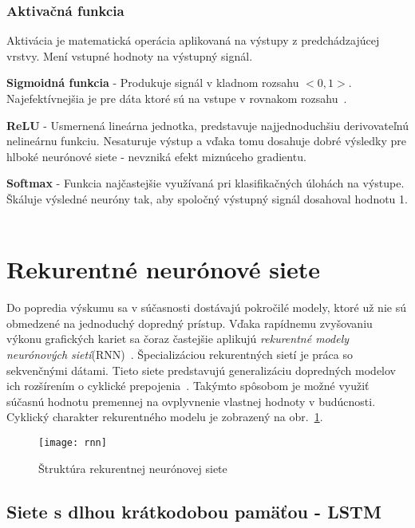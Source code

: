 \subsubsection*{Aktivačná funkcia}
\label{activation_function}

Aktivácia je matematická operácia aplikovaná na výstupy z predchádzajúcej vrstvy. Mení vstupné hodnoty na výstupný signál. 

\textbf{Sigmoidná funkcia} - Produkuje signál v kladnom rozsahu $<0,1>$. Najefektívnejšia je pre dáta ktoré sú na vstupe v rovnakom rozsahu~\cite{sibi2013analysis}.

\textbf{ReLU} - Usmernená lineárna jednotka, predstavuje najjednoduchšiu derivovateľnú nelineárnu funkciu. Nesaturuje výstup a vďaka tomu dosahuje dobré výsledky pre hlboké neurónové siete - nevzniká efekt miznúceho gradientu.
	
\textbf{Softmax} - Funkcia najčastejšie využívaná pri klasifikačných úlohách na výstupe. Škáluje výsledné neuróny tak, aby spoločný výstupný signál dosahoval hodnotu 1. ~\cite{toth2013phone}


\section{Rekurentné neurónové siete}
\label{analyza_pokrocile_modely_nn}

Do popredia výskumu sa v súčasnosti dostávajú pokročilé modely, ktoré už nie sú obmedzené na jednoduchý dopredný prístup. Vďaka rapídnemu zvyšovaniu výkonu grafických kariet sa čoraz častejšie aplikujú \textit{rekurentné modely neurónových sietí}(RNN)~\cite{jaeger2002tutorial}. Špecializáciou rekurentných sietí je práca so sekvenčnými dátami. Tieto siete predstavujú generalizáciu dopredných modelov ich rozšírením o cyklické prepojenia~\cite{Goodfellow-et-al-2016-Book}.
Takýmto spôsobom je možné využiť súčasnú hodnotu premennej na ovplyvnenie vlastnej hodnoty v budúcnosti. Cyklický charakter rekurentného modelu je zobrazený na obr.~\ref{fig:rnn}.

\begin{figure}[H]
\begin{center}\texttt{[image: rnn]}\end{center}
\caption[rnn]{Štruktúra rekurentnej neurónovej siete~\cite{jaeger2002tutorial}}\label{fig:rnn}
\end{figure}

\subsection{Siete s dlhou krátkodobou pamäťou - LSTM}


